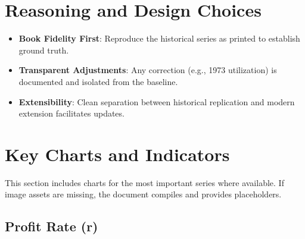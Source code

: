 \documentclass[12pt,a4paper]{article}
\begin{document}
\section{Reasoning and Design Choices}
\begin{itemize}[leftmargin=1.2em]
    \item \textbf{Book Fidelity First}: Reproduce the historical series as printed to establish ground truth.
    \item \textbf{Transparent Adjustments}: Any correction (e.g., 1973 utilization) is documented and isolated from the baseline.
    \item \textbf{Extensibility}: Clean separation between historical replication and modern extension facilitates updates.
\end{itemize}

\section{Key Charts and Indicators}
This section includes charts for the most important series where available. If image assets are missing, the document compiles and provides placeholders.

\subsection{Profit Rate (r)}
\end{document}
